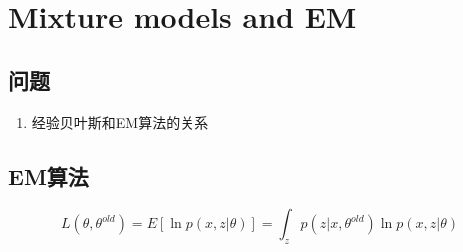 \chapter{Mixture models and EM}
\section{问题}
\begin{enumerate}
\item 经验贝叶斯和EM算法的关系
\end{enumerate}

\section{EM算法}
\begin{equation}
L(\theta, \theta^{old}) = E[\ln p(x,z|\theta)]
 = \int_z p(z|x,\theta^{old})\ln p(x,z|\theta)
\end{equation}
